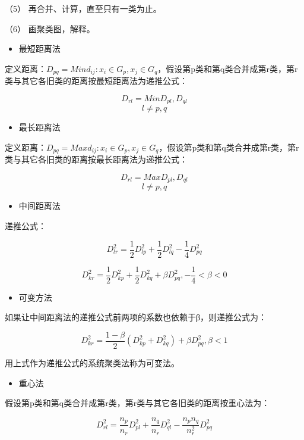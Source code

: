 \documentclass[]{ctexbook}
\providecommand{\tightlist}{%
  \setlength{\itemsep}{0pt}\setlength{\parskip}{0pt}}
\begin{document}
（5） 再合并、计算，直至只有一类为止。

（6） 画聚类图，解释。

\begin{itemize}
\tightlist
\item
  最短距离法
\end{itemize}

定义距离：\(D_{pq}=Min{d_{ij}:x_i\in G_p,x_j\in G_q}\)，假设第p类和第q类合并成第r类，第r类与其它各旧类的距离按最短距离法为递推公式：

\[D_{rl}=Min{D_{pl},D_{ql}}\] \[l\neq p,q\]

\begin{itemize}
\tightlist
\item
  最长距离法
\end{itemize}

定义距离：\(D_{pq}=Max{d_{ij}:x_i\in G_p,x_j\in G_q}\)，假设第p类和第q类合并成第r类，第r类与其它各旧类的距离按最长距离法为递推公式：

\[D_{rl}=Max{D_{pl},D_{ql}}\] \[l\neq p,q\]

\begin{itemize}
\tightlist
\item
  中间距离法
\end{itemize}

递推公式：

\[D_{lr}^2=\frac{1}{2}D_{lp}^2+\frac{1}{2}D_{lq}^2-\frac{1}{4}D_{pq}^2\]

\[D_{kr}^2=\frac{1}{2}D_{kp}^2+\frac{1}{2}D_{kq}^2+\beta D_{pq}^2,-\frac{1}{4}< \beta < 0\]

\begin{itemize}
\tightlist
\item
  可变方法
\end{itemize}

如果让中间距离法的递推公式前两项的系数也依赖于β，则递推公式为：

\[D_{kr}^2=\frac{1-\beta}{2}(D_{kp}^2+D_{kq}^2)+\beta D_{pq}^2,\beta < 1\]

用上式作为递推公式的系统聚类法称为可变法。

\begin{itemize}
\tightlist
\item
  重心法
\end{itemize}

假设第p类和第q类合并成第r类，第r类与其它各旧类的距离按重心法为：

\[D_{rl}^2=\frac{n_p}{n_r}D_{pl}^2+\frac{n_q}{n_r}D_{ql}^2-\frac{n_pn_q}{n_r^2}D_{pq}^2\]
\end{document}
